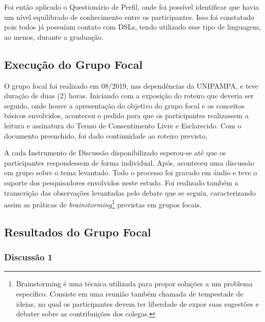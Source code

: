 Foi então aplicado o Questionário de Perfil, onde foi possível identificar que havia um nível equilibrado de conhecimento entre os participantes. 
Isso foi constatado pois todos já possuíam contato com \acp{DSL}, tendo utilizado esse tipo de linguagem, ao menos, durante a graduação.

\subsection{Execução do Grupo Focal}

O grupo focal foi realizado em 08/2019, nas dependências da UNIPAMPA, e teve duração de duas (2) horas. 
Iniciando com a exposição do roteiro que deveria ser seguido, onde houve a apresentação do objetivo do grupo focal e os conceitos básicos envolvidos, aconteceu o pedido para que os participantes realizassem a leitura e assinatura do Termo de Consentimento Livre e Esclarecido. 
Com o documento preenchido, foi dado continuidade ao roteiro previsto, 

A cada Instrumento de Discussão disponibilizado esperou-se até que os participantes respondessem de forma individual. 
Após, aconteceu uma discussão em grupo sobre o tema levantado. 
Todo o processo foi gravado em áudio e teve o suporte dos pesquisadores envolvidos neste estudo. 
Foi realizado também a transcrição das observações levantadas pelo debate que se seguiu, caracterizando assim as práticas de \textit{brainstorming}\footnote{Brainstorming é uma técnica utilizada para propor soluções a um problema específico. Consiste em uma reunião também chamada de tempestade de ideias, na qual os participantes devem ter liberdade de expor suas sugestões e debater sobre as contribuições dos colegas.} previstas em grupos focais. 

\subsection{Resultados do Grupo Focal}



\subsubsection{Discussão 1}

% 

